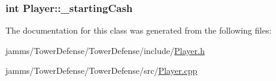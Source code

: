 \hypertarget{class_player_a15fed4726f088fdf48f0b9ae54cac148}{
\subsubsection[{\+\_\+starting\+Cash}]{\setlength{\rightskip}{0pt plus 5cm}int Player\+::\+\_\+starting\+Cash\hspace{0.3cm}{\ttfamily [private]}}}\label{class_player_a15fed4726f088fdf48f0b9ae54cac148}


The documentation for this class was generated from the following files\+:\begin{DoxyCompactItemize}
\item 
jamms/\+Tower\+Defense/\+Tower\+Defense/include/\hyperlink{_player_8h}{Player.\+h}\item 
jamms/\+Tower\+Defense/\+Tower\+Defense/src/\hyperlink{_player_8cpp}{Player.\+cpp}\end{DoxyCompactItemize}
